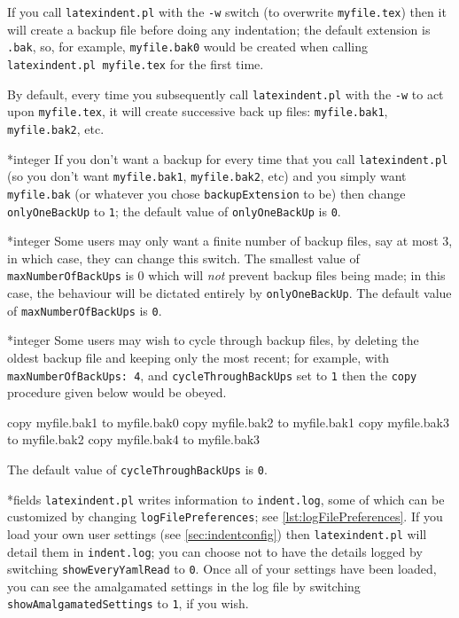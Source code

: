 	If you call \texttt{latexindent.pl} with the \texttt{-w} switch (to overwrite
	\texttt{myfile.tex}) then it will create a backup file before doing any indentation;
	the default extension is \texttt{.bak}, so, for example,
	\texttt{myfile.bak0} would be created when calling \texttt{latexindent.pl myfile.tex} for the
	first time.

	By default, every time you subsequently call \texttt{latexindent.pl} with the
	\texttt{-w} to act upon \texttt{myfile.tex}, it will create successive
	back up files: \texttt{myfile.bak1}, \texttt{myfile.bak2}, etc.

*{integer}
	\label{page:onlyonebackup}
	If you don't want a backup for every time that you call \texttt{latexindent.pl} (so
	you don't want \texttt{myfile.bak1}, \texttt{myfile.bak2}, etc) and you
	simply want \texttt{myfile.bak} (or whatever you chose \texttt{backupExtension} to be) then change \texttt{onlyOneBackUp} to
	\texttt{1}; the default value of \texttt{onlyOneBackUp} is
	\texttt{0}.

*{integer}
	Some users may only want a finite number of backup files, say at most
	$3$, in which case, they can change this switch. The smallest value of
	\texttt{maxNumberOfBackUps} is $0$ which will \emph{not}
	prevent backup files being made; in this case, the behaviour will be dictated entirely by
	\texttt{onlyOneBackUp}. The default value of \texttt{maxNumberOfBackUps} is
	\texttt{0}.

*{integer}
	Some users may wish to cycle through backup files, by deleting the oldest backup file and
	keeping only the most recent; for example, with \texttt{maxNumberOfBackUps: 4}, and
	\texttt{cycleThroughBackUps} set to \texttt{1} then the \texttt{copy}
	procedure given below would be obeyed.

	\begin{commandshell}
copy myfile.bak1 to myfile.bak0
copy myfile.bak2 to myfile.bak1
copy myfile.bak3 to myfile.bak2
copy myfile.bak4 to myfile.bak3
\end{commandshell}
	The default value of \texttt{cycleThroughBackUps} is \texttt{0}.

*{fields}
	\texttt{latexindent.pl} writes information to \texttt{indent.log}, some
	of which can be customized by changing \texttt{logFilePreferences}; see
	\cref{lst:logFilePreferences}. If you load your own user settings (see \vref{sec:indentconfig})
	then \texttt{latexindent.pl} will detail them in \texttt{indent.log}; you can choose
	not to have the details logged by switching \texttt{showEveryYamlRead} to
	\texttt{0}. Once all of your settings have been loaded, you can see the
	amalgamated settings in the log file by switching \texttt{showAmalgamatedSettings} to
	\texttt{1}, if you wish.


